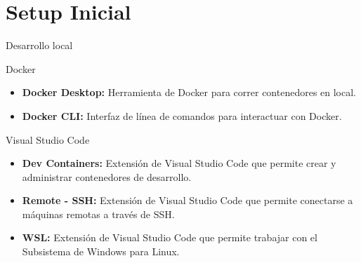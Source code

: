 \documentclass{beamer}
\begin{document}
\section{Setup Inicial}
\begin{frame}{Desarrollo local}
  \begin{block}{Docker}
    \begin{itemize}
      \item \textbf{Docker Desktop:} Herramienta de Docker para correr contenedores en local.
      \item \textbf{Docker CLI:} Interfaz de línea de comandos para interactuar con Docker.
    \end{itemize}
  \end{block}
  \begin{block}{Visual Studio Code}
    \begin{itemize}
      \item \textbf{Dev Containers:} Extensión de Visual Studio Code que permite crear y administrar contenedores de desarrollo.
      \item \textbf{Remote - SSH:} Extensión de Visual Studio Code que permite conectarse a máquinas remotas a través de SSH.
      \item \textbf{WSL:} Extensión de Visual Studio Code que permite trabajar con el Subsistema de Windows para Linux.
    \end{itemize}
  \end{block}
\end{frame}
\end{document}
